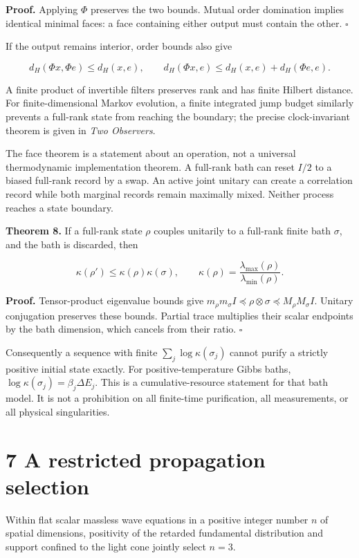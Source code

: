 \documentclass[
  11pt,
  a4paper,
]{article}
\begin{document}
\textbf{Proof.} Applying \(\Phi\) preserves the two bounds. Mutual order domination implies identical minimal faces: a face containing either output must contain the other. \(\square\)

If the output remains interior, order bounds also give

\[d_H(\Phi x,\Phi e)\le d_H(x,e),\qquad
d_H(\Phi x,e)\le d_H(x,e)+d_H(\Phi e,e).\]

A finite product of invertible filters preserves rank and has finite Hilbert distance. For finite-dimensional Markov evolution, a finite integrated jump budget similarly prevents a full-rank state from reaching the boundary; the precise clock-invariant theorem is given in \emph{Two Observers}.

The face theorem is a statement about an operation, not a universal thermodynamic implementation theorem. A full-rank bath can reset \(I/2\) to a biased full-rank record by a swap. An active joint unitary can create a correlation record while both marginal records remain maximally mixed. Neither process reaches a state boundary.

\textbf{Theorem 8.} If a full-rank state \(\rho\) couples unitarily to a full-rank finite bath \(\sigma\), and the bath is discarded, then

\[\kappa(\rho')\le\kappa(\rho)\kappa(\sigma),\qquad
\kappa(\rho)=\frac{\lambda_{\max}(\rho)}{\lambda_{\min}(\rho)}.\]

\textbf{Proof.} Tensor-product eigenvalue bounds give \(m_\rho m_\sigma I\preceq\rho\otimes\sigma\preceq M_\rho M_\sigma I\). Unitary conjugation preserves these bounds. Partial trace multiplies their scalar endpoints by the bath dimension, which cancels from their ratio. \(\square\)

Consequently a sequence with finite \(\sum_j\log\kappa(\sigma_j)\) cannot purify a strictly positive initial state exactly. For positive-temperature Gibbs baths, \(\log\kappa(\sigma_j)=\beta_j\Delta E_j\). This is a cumulative-resource statement for that bath model. It is not a prohibition on all finite-time purification, all measurements, or all physical singularities.

\section{7 A restricted propagation selection}\label{a-restricted-propagation-selection}

Within flat scalar massless wave equations in a positive integer number \(n\) of spatial dimensions, positivity of the retarded fundamental distribution and support confined to the light cone jointly select \(n=3\).
\end{document}
